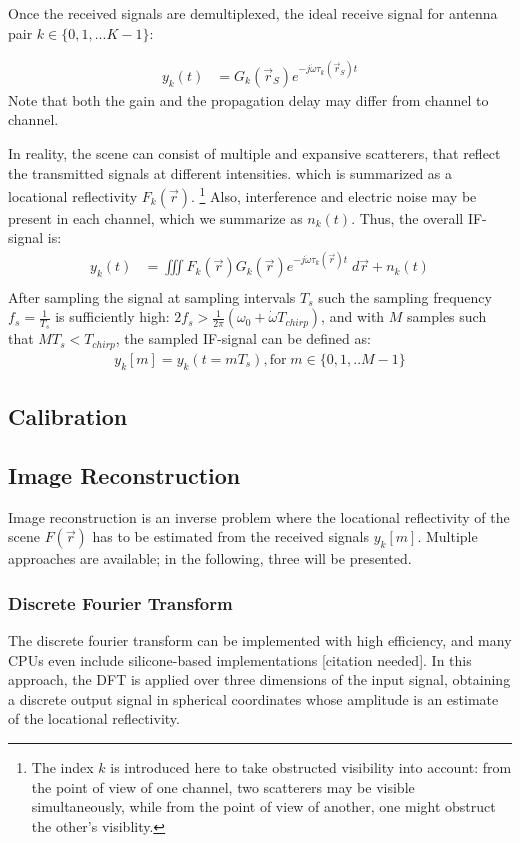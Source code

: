 Once the received signals are demultiplexed, the ideal receive signal for antenna pair $k \in \{0,1,...K-1\}$:

\begin{align}
    y_k(t) & = G_k(\vec r_S)e^{-j\dot\omega\tau_k(\vec r_S)t} \label{eqn:ideal_scatterer}
\end{align}
Note that both the gain and the propagation delay may differ from channel to channel.

In reality, the scene can consist of multiple and expansive scatterers,
that reflect the transmitted signals at different intensities.
which is summarized as a locational reflectivity $F_k(\vec r)$.
\footnote{
    The index $k$ is introduced here to take obstructed visibility into account:
    from the point of view of one channel, two scatterers may be visible simultaneously,
    while from the point of view of another, one might obstruct the other's visiblity.
}
Also, interference and electric noise may be present in each channel,
which we summarize as $n_k(t)$.
Thus, the overall IF-signal is:
\begin{align}
    y_k(t) & = \iiint F_k(\vec r)G_k(\vec r) e^{-j\dot\omega\tau_k(\vec r)t} \;d\vec r + n_k(t) \\
\end{align}
After sampling the signal at sampling intervals $T_s$ such the sampling frequency $f_s = \frac{1}{T_s}$
is sufficiently high: ${2f_s > \frac{1}{2\pi}(\omega_0 + \dot \omega T_{chirp})}$, and with $M$ samples such that $MT_s < T_{chirp}$,
the sampled IF-signal can be defined as:
\begin{align}
    y_k[m] = y_k(t=mT_s), \text{for}\;m \in \{0,1,..M-1\}
\end{align}


\subsection{Calibration}

\subsection{Image Reconstruction}
Image reconstruction is an inverse problem where the locational reflectivity of the scene $F(\vec r)$
has to be estimated from the received signals $y_k[m]$.
Multiple approaches are available; in the following, three will be presented.

\subsubsection*{Discrete Fourier Transform}
The discrete fourier transform can be implemented with high efficiency,
and many CPUs even include silicone-based implementations [citation needed].
In this approach, the DFT is applied over three dimensions of the input signal,
obtaining a discrete output signal in spherical coordinates whose amplitude is an estimate of the locational reflectivity.


